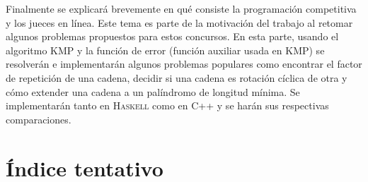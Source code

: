 \documentclass[letterpaper,11pt]{article}
\begin{document}
Finalmente se explicará brevemente en qué consiste la programación competitiva y los jueces en
línea. Este tema es parte de la motivación del trabajo al retomar algunos problemas propuestos
para estos concursos. En esta parte, usando el algoritmo KMP y la función de error (función
auxiliar usada en KMP) se resolverán e implementarán algunos problemas populares como encontrar
el factor de repetición de una cadena, decidir si una cadena es rotación cíclica de otra y cómo
extender una cadena a un palíndromo de longitud mínima. Se implementarán tanto en \textsc{Haskell}
como en \textsc{C++} y se harán sus respectivas comparaciones.

\section{Índice tentativo}
\end{document}
